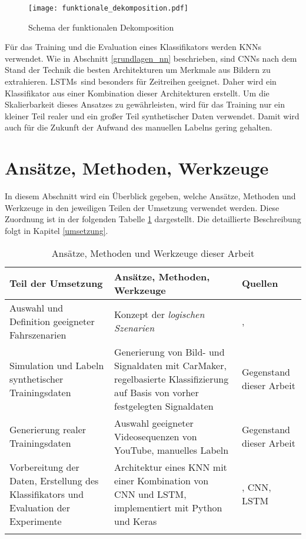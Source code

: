 \begin{figure}[h]
\centering
\texttt{[image: funktionale\_dekomposition.pdf]}
\caption{Schema der funktionalen Dekomposition \cite{amersbach2017functional}}
\label{fig_functional_decomposition}
\end{figure}

Für das Training und die Evaluation eines Klassifikators werden \acp{KNN} verwendet. Wie in Abschnitt \ref{grundlagen_nn} beschrieben, sind \acp{CNN} nach dem Stand der Technik die besten Architekturen um Merkmale aus Bildern zu extrahieren. \acp{LSTM} sind besonders für Zeitreihen geeignet. Daher wird ein Klassifikator aus einer Kombination dieser Architekturen erstellt. Um die Skalierbarkeit dieses Ansatzes zu gewährleisten, wird für das Training nur ein kleiner Teil realer und ein großer Teil synthetischer Daten verwendet. Damit wird auch für die Zukunft der Aufwand des manuellen Labelns gering gehalten.


\section{Ansätze, Methoden, Werkzeuge}
\label{konzept_methodik}

In diesem Abschnitt wird ein Überblick gegeben, welche Ansätze, Methoden und Werkzeuge in den jeweiligen Teilen der Umsetzung verwendet werden. Diese Zuordnung ist in der folgenden Tabelle \ref{tab_konzept_methods} dargestellt. Die detaillierte Beschreibung folgt in Kapitel \ref{umsetzung}.

\small
\begin{longtable}[c]{p{5cm} p{6.5cm} p{1.5cm}}
\textbf{Teil der Umsetzung} & \textbf{Ansätze, Methoden, Werkzeuge} & \textbf{Quellen} \\
\hline
\endhead

Auswahl und Definition geeigneter Fahrszenarien & Konzept der \textit{logischen Szenarien} & \cite{ulbrich2015defining}, \cite{bagschik2017szenarien} \\
\hline
Simulation und Labeln synthetischer Trainingsdaten & Generierung von Bild- und Signaldaten mit CarMaker, regelbasierte Klassifizierung auf Basis von vorher festgelegten Signaldaten & Gegenstand dieser Arbeit \\
\hline
Generierung realer Trainingsdaten & Auswahl geeigneter Videosequenzen von YouTube, manuelles Labeln & Gegenstand dieser Arbeit \\
\hline
Vorbereitung der Daten, Erstellung des Klassifikators und Evaluation der Experimente & Architektur eines \ac{KNN} mit einer Kombination von \ac{CNN} und \ac{LSTM}, implementiert mit Python und Keras & \cite{chollet2015keras}, CNN, LSTM \\

\hline
\caption{Ansätze, Methoden und Werkzeuge dieser Arbeit}
\label{tab_konzept_methods}
\end{longtable}
\normalsize




